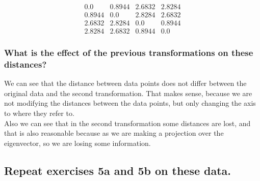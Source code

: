 \documentclass[12pt]{article}
\begin{document}
\begin{equation}
    \begin{matrix}
        0.0 & 0.8944 & 2.6832 & 2.8284 \\
        0.8944 & 0.0 & 2.8284 & 2.6832 \\
        2.6832 & 2.8284 &  0.0 & 0.8944 \\
        2.8284 & 2.6832 &  0.8944 & 0.0    
    \end{matrix}
\end{equation}

\subsubsection{What is the effect of the previous transformations on these distances?}

We can see that the distance between data points does not differ between the original data and the second transformation. That makes sense, because we are not modifying the distances between the data points, but only changing the axis to where they refer to. \\

Also we can see that in the second transformation some distances are lost, and that is also reasonable because as we are making a projection over the eigenvector, so we are losing some information. 

\subsection{Repeat exercises 5a and 5b on these data.}
\end{document}
